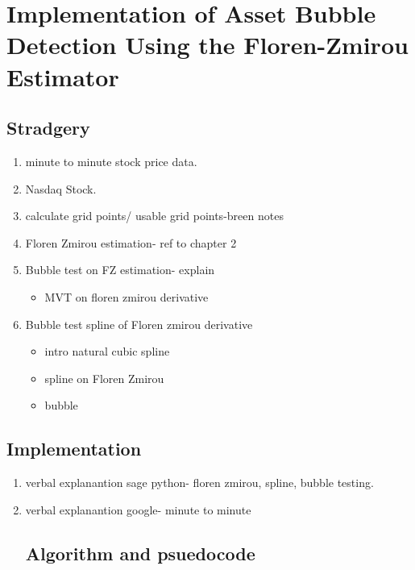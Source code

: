 \chapter{Implementation of Asset Bubble Detection Using the Floren-Zmirou Estimator}
\section{Stradgery}
\begin{enumerate}
  \item minute to minute stock price data\cite{google}.
  \item Nasdaq Stock.
  \item calculate grid points/ usable grid points-breen notes
  \item Floren Zmirou estimation- ref to chapter 2
  \item Bubble test on FZ estimation- explain
  \begin{itemize}
    \item MVT on floren zmirou derivative
  \end{itemize}
  \item Bubble test spline of Floren zmirou derivative
  \begin{itemize}\cite{RPPA}
    \item intro natural cubic spline
    \item spline on Floren Zmirou
    \item bubble
  \end{itemize}
\end{enumerate}
\section{Implementation}
\begin{enumerate}
  \item verbal explanantion sage python- floren zmirou, spline, bubble testing.
  \item verbal explanantion google- minute to minute
\section{Algorithm and psuedocode}

\end{enumerate}

